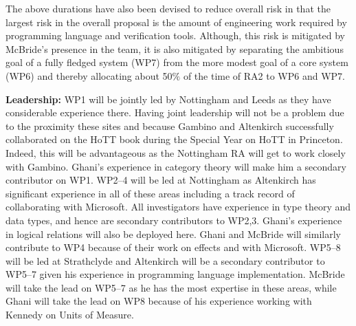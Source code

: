 \documentclass[a4paper,11pt]{article}
\begin{document}
The above durations have also been devised to reduce overall risk in
that the largest risk in the overall proposal is the amount of
engineering work required by programming language and verification
tools. Although, this risk is mitigated by McBride's presence in the
team, it is also mitigated by separating the ambitious goal of a fully
fledged system (WP7) from the more modest goal of a core system (WP6)
and thereby allocating about 50$\%$ of the time of RA2 to WP6 and
WP7.






{\bf Leadership:} WP1 will be jointly led by Nottingham and Leeds as
they have considerable experience there. Having joint leadership will
not be a problem due to the proximity these sites and because Gambino
and Altenkirch successfully collaborated on the HoTT book during the
Special Year on HoTT in Princeton. Indeed, this will be advantageous
as the Nottingham RA will get to work closely with Gambino. Ghani's
experience in category theory will make him a secondary contributor on
WP1. WP2--4 will be led at Nottingham as Altenkirch has significant
experience in all of these areas including a track record of
collaborating with Microsoft. All investigators have experience in
type theory and data types, and hence are secondary contributors to
WP2,3. Ghani's experience in logical relations will also be deployed
here. Ghani and McBride will similarly contribute
to WP4 because of their work on effects and with Microsoft. WP5--8
will be led at Strathclyde and Altenkirch will be a secondary
contributor to WP5--7 given his experience in programming language
implementation. McBride will take the lead on WP5--7 as he has the
most expertise in these areas, while Ghani will take the lead on WP8
because of his experience working with Kennedy on Units of Measure.
\end{document}
